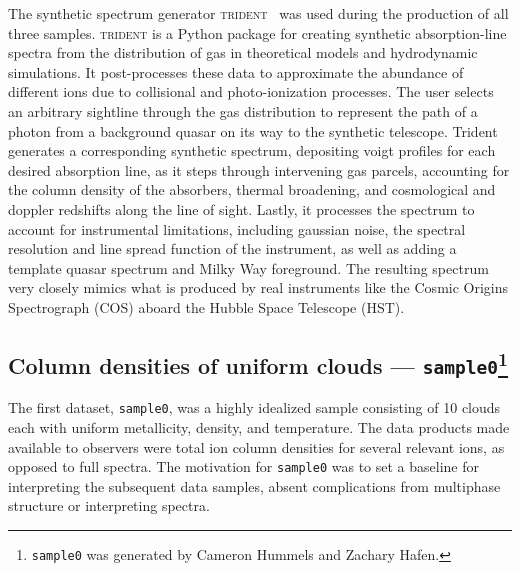 \documentclass[fleqn,usenatbib]{mnras}
\begin{document}
The synthetic spectrum generator \textsc{trident}~\citep{hummels2017Trident} was used during the production of all three samples.  \textsc{trident} is a Python package for creating synthetic absorption-line spectra from the distribution of gas in theoretical models and hydrodynamic simulations. It post-processes these data to approximate the abundance of different ions due to collisional and photo-ionization processes.  The user selects an arbitrary sightline through the gas distribution to represent the path of a photon from a background quasar on its way to the synthetic telescope.  Trident generates a corresponding synthetic spectrum, depositing voigt profiles for each desired absorption line, as it steps through intervening gas parcels, accounting for the column density of the absorbers, thermal broadening, and cosmological and doppler redshifts along the line of sight.  Lastly, it processes the  spectrum to account for instrumental limitations, including gaussian noise, the spectral resolution and line spread function of the instrument, as well as adding a template quasar spectrum and Milky Way foreground.  The resulting spectrum very closely mimics what is produced by real instruments like the Cosmic Origins Spectrograph (COS) aboard the Hubble Space Telescope (HST).

\subsection[Column densities of uniform clouds --- \texttt{sample0}]{Column densities of uniform clouds --- \texttt{sample0}\footnote{
\texttt{sample0} was generated by Cameron Hummels and Zachary Hafen.}}
\label{s: data generation -- sample0}

The first dataset, \texttt{sample0}, was a highly idealized sample consisting of 10 clouds each with uniform metallicity, density, and temperature.
The data products made available to observers were total  ion column densities for several relevant ions, as opposed to full spectra.
The motivation for \texttt{sample0} was to set a baseline for interpreting the subsequent data samples, absent complications from multiphase structure or interpreting spectra.
\end{document}
